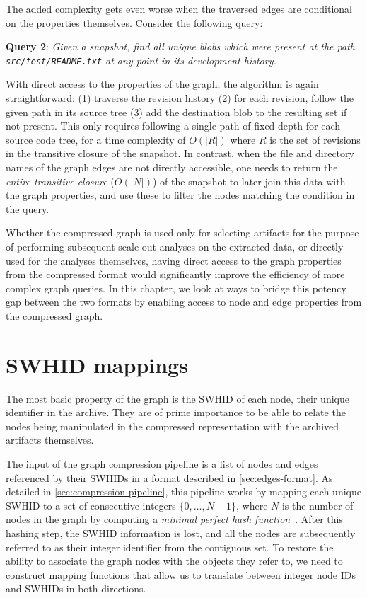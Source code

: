 The added complexity gets even worse when the traversed edges are conditional
on the properties themselves. Consider the following query:

\textbf{Query 2}: \emph{Given a snapshot, find all unique blobs which were
present at the path \allowbreak\texttt{src/test/README.txt} at any point in its
development history.}

With direct access to the properties of the graph, the algorithm is again
straightforward: (1) traverse the revision history (2) for each revision,
follow the given path in its source tree (3) add the destination blob to the
resulting set if not present. This only requires following a single path of
fixed depth for each source code tree, for a time complexity of $O(|R|)$ where
$R$ is the set of revisions in the transitive closure of the snapshot. In
contrast, when the file and directory names of the graph edges are not directly
accessible, one needs to return the \emph{entire transitive closure} ($O(|N|)$)
of the snapshot to later join this data with the graph properties, and use
these to filter the nodes matching the condition in the query.

Whether the compressed graph is used only for selecting artifacts for the
purpose of performing subsequent scale-out analyses on the extracted data, or
directly used for the analyses themselves, having direct access to the graph
properties from the compressed format would significantly improve the
efficiency of more complex graph queries.
In this chapter, we look at ways to bridge this potency gap between the two
formats by enabling access to node and edge properties from the compressed
graph.

\section{SWHID mappings}

The most basic property of the graph is the \acrfull{SWHID} of each node, their
unique identifier in the archive. They are of prime importance to be able to
relate the nodes being manipulated in the compressed representation with the
archived artifacts themselves.

The input of the graph compression pipeline is a list of nodes and edges
referenced by their \glspl{SWHID} in a format described in
\cref{sec:edges-format}.  As detailed in \cref{sec:compression-pipeline}, this
pipeline works by mapping each unique \gls{SWHID} to a set of consecutive
integers $\{0,\ldots,N-1\}$, where $N$ is the number of nodes in the graph by
computing a \emph{minimal perfect hash function}~\cite{GOVFSCF}.  After this
hashing step, the \gls{SWHID} information is lost, and all the nodes are
subsequently referred to as their integer identifier from the contiguous set.
To restore the ability to associate the graph nodes with the objects they refer
to, we need to construct mapping functions that allow us to translate between
integer node IDs and \glspl{SWHID} in both directions.

